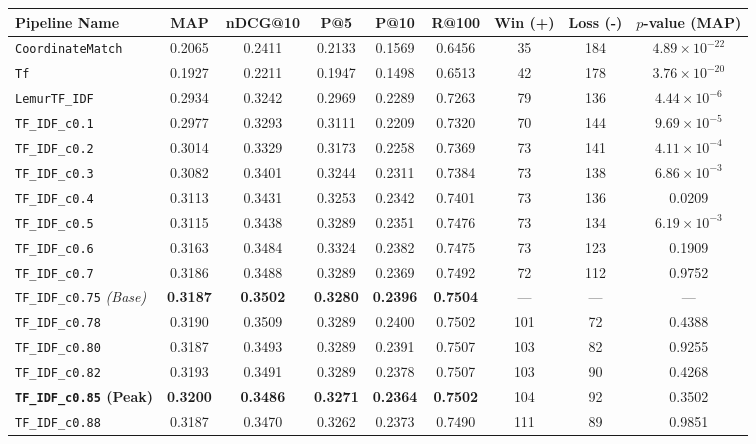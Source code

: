 \documentclass[10pt, a4paper]{article}
\begin{document}
\begin{table}[H]
\centering
\small
\begin{tabular}{@{}lcccccccc@{}}
\toprule
\textbf{Pipeline Name} & \textbf{MAP} & \textbf{nDCG@10} & \textbf{P@5} & \textbf{P@10} & \textbf{R@100} & \textbf{Win (+)} & \textbf{Loss (-)} & \textbf{$p$-value (MAP)} \\ \midrule
\texttt{CoordinateMatch} & 0.2065 & 0.2411 & 0.2133 & 0.1569 & 0.6456 & 35 & 184 & $4.89 \times 10^{-22}$ \\
\texttt{Tf} & 0.1927 & 0.2211 & 0.1947 & 0.1498 & 0.6513 & 42 & 178 & $3.76 \times 10^{-20}$ \\
\texttt{LemurTF\_IDF} & 0.2934 & 0.3242 & 0.2969 & 0.2289 & 0.7263 & 79 & 136 & $4.44 \times 10^{-6}$ \\ \midrule
\texttt{TF\_IDF\_c0.1} & 0.2977 & 0.3293 & 0.3111 & 0.2209 & 0.7320 & 70 & 144 & $9.69 \times 10^{-5}$ \\
\texttt{TF\_IDF\_c0.2} & 0.3014 & 0.3329 & 0.3173 & 0.2258 & 0.7369 & 73 & 141 & $4.11 \times 10^{-4}$ \\
\texttt{TF\_IDF\_c0.3} & 0.3082 & 0.3401 & 0.3244 & 0.2311 & 0.7384 & 73 & 138 & $6.86 \times 10^{-3}$ \\
\texttt{TF\_IDF\_c0.4} & 0.3113 & 0.3431 & 0.3253 & 0.2342 & 0.7401 & 73 & 136 & 0.0209 \\
\texttt{TF\_IDF\_c0.5} & 0.3115 & 0.3438 & 0.3289 & 0.2351 & 0.7476 & 73 & 134 & $6.19 \times 10^{-3}$ \\
\texttt{TF\_IDF\_c0.6} & 0.3163 & 0.3484 & 0.3324 & 0.2382 & 0.7475 & 73 & 123 & 0.1909 \\
\texttt{TF\_IDF\_c0.7} & 0.3186 & 0.3488 & 0.3289 & 0.2369 & 0.7492 & 72 & 112 & 0.9752 \\
\texttt{TF\_IDF\_c0.75} \textit{(Base)} & \textbf{0.3187} & \textbf{0.3502} & \textbf{0.3280} & \textbf{0.2396} & \textbf{0.7504} & --- & --- & --- \\
\texttt{TF\_IDF\_c0.78} & 0.3190 & 0.3509 & 0.3289 & 0.2400 & 0.7502 & 101 & 72 & 0.4388 \\
\texttt{TF\_IDF\_c0.80} & 0.3187 & 0.3493 & 0.3289 & 0.2391 & 0.7507 & 103 & 82 & 0.9255 \\
\texttt{TF\_IDF\_c0.82} & 0.3193 & 0.3491 & 0.3289 & 0.2378 & 0.7507 & 103 & 90 & 0.4268 \\
\textbf{\texttt{TF\_IDF\_c0.85} (Peak)} & \textbf{0.3200} & \textbf{0.3486} & \textbf{0.3271} & \textbf{0.2364} & \textbf{0.7502} & 104 & 92 & 0.3502 \\
\texttt{TF\_IDF\_c0.88} & 0.3187 & 0.3470 & 0.3262 & 0.2373 & 0.7490 & 111 & 89 & 0.9851 \\

\end{tabular}
\end{table}
\end{document}
